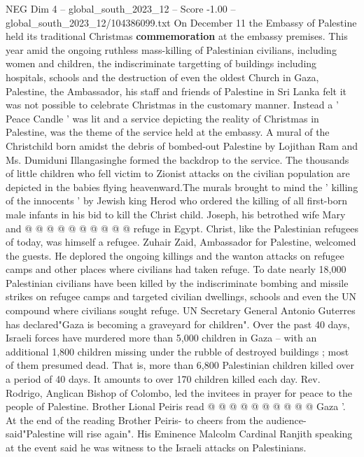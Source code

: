 \begin{textsample}{NEG Dim 4 – global\_south\_2023\_12 – Score -1.00 – global\_south\_2023\_12/104386099.txt}  \label{ex:f4_neg_312}
On December 11 the Embassy of Palestine held its traditional Christmas \textbf{commemoration} at the embassy premises.
This year amid the ongoing ruthless mass-killing of Palestinian civilians, including women and children, the indiscriminate targetting of buildings including hospitals, schools and the destruction of even the oldest Church in Gaza, Palestine, the Ambassador, his staff and friends of Palestine in Sri Lanka felt it was not possible to celebrate Christmas in the customary manner.
Instead a ' Peace Candle ' was lit and a service depicting the reality of Christmas in Palestine, was the theme of the service held at the embassy.
A mural of the Christchild born amidst the debris of bombed-out Palestine by Lojithan Ram and Ms.
Dumiduni Illangasinghe formed the backdrop to the service.
The thousands of little children who fell victim to Zionist attacks on the civilian population are depicted in the babies flying heavenward.The murals brought to mind the ' killing of the innocents ' by Jewish king Herod who ordered the killing of all first-born male infants in his bid to kill the Christ child.
Joseph, his betrothed wife Mary and @ @ @ @ @ @ @ @ @ @ refuge in Egypt.
Christ, like the Palestinian refugees of today, was himself a refugee.
Zuhair Zaid, Ambassador for Palestine, welcomed the guests.
He deplored the ongoing killings and the wanton attacks on refugee camps and other places where civilians had taken refuge.
To date nearly 18,000 Palestinian civilians have been killed by the indiscriminate bombing and missile strikes on refugee camps and targeted civilian dwellings, schools and even the UN compound where civilians sought refuge.
UN Secretary General Antonio Guterres has declared"Gaza is becoming a graveyard for children".
Over the past 40 days, Israeli forces have murdered more than 5,000 children in Gaza -- with an additional 1,800 children missing under the rubble of destroyed buildings ; most of them presumed dead.
That is, more than 6,800 Palestinian children killed over a period of 40 days.
It amounts to over 170 children killed each day.
Rev.
Rodrigo, Anglican Bishop of Colombo, led the invitees in prayer for peace to the people of Palestine.
Brother Lional Peiris read @ @ @ @ @ @ @ @ @ @ Gaza '.
At the end of the reading Brother Peiris- to cheers from the audience- said"Palestine will rise again".
His Eminence Malcolm Cardinal Ranjith speaking at the event said he was witness to the Israeli attacks on Palestinians.

\end{textsample}
